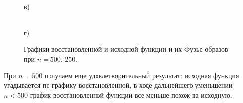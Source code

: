 \documentclass[a5paper, 10pt]{article}
\theoremstyle{definition}
\theoremstyle{plain}
\theoremstyle{remark}
\begin{document}
\begin{figure}[h!]
\begin{minipage}[h!]{0.5\linewidth}
 \\в)
\end{minipage}
\hfill
\begin{minipage}[h!]{0.5\linewidth}
 \\г)
\end{minipage}
\caption{ Графики восстановленной и исходной функции и их Фурье-образов при $n=500, \, 250$.}
\end{figure}


\newpage
При $n=500$ получаем еще удовлетворительный результат: исходная функция угадывается по графику восстановленной, в ходе дальнейшего уменьшении $n < 500$ график восстановленной функции все меньше похож на исходную.\\
\end{document}
